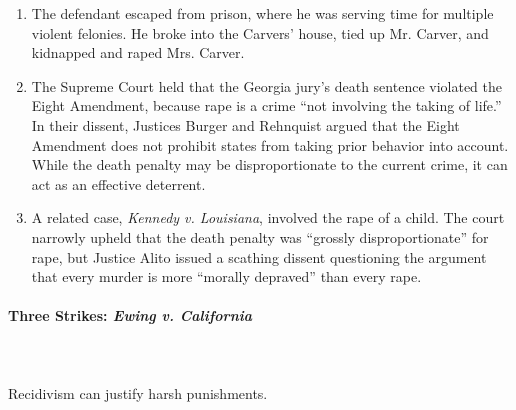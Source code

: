 \begin{enumerate}
    \item The defendant escaped from prison, where he was serving time for 
    multiple violent felonies. He broke into the Carvers' house, tied up Mr. 
    Carver, and kidnapped and raped Mrs. Carver.
    \item The Supreme Court held that the Georgia jury's death sentence 
    violated the Eight Amendment, because rape is a crime ``not involving the 
    taking of life.'' In their dissent, Justices Burger and Rehnquist argued 
    that the Eight Amendment does not prohibit states from taking prior 
    behavior into account. While the death penalty may be disproportionate to 
    the current crime, it can act as an effective deterrent.
    \item A related case, \emph{Kennedy v. Louisiana}, involved the rape of a 
    child. The court narrowly upheld that the death penalty was ``grossly 
    disproportionate'' for rape, but Justice Alito issued a scathing dissent 
    questioning the argument that every murder is more ``morally depraved'' 
    than every rape.
\end{enumerate}

\paragraph{Three Strikes: \emph{Ewing v. California}}
~\\\\
Recidivism can justify harsh punishments.

